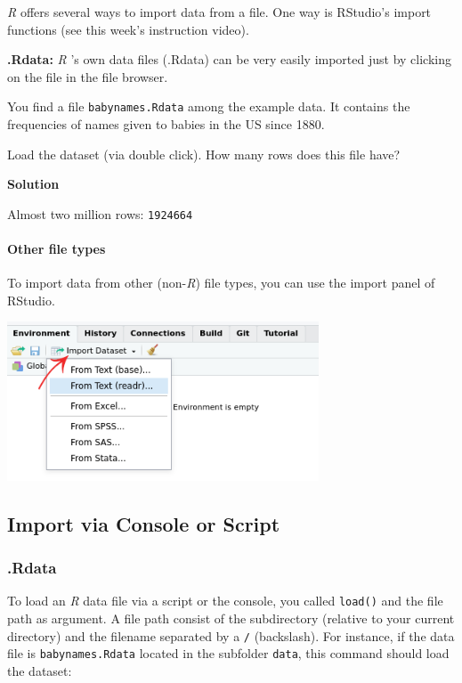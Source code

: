 \documentclass[
]{scrartcl}
\makeatletter
\newenvironment{kframe}{%
\medskip{}
\setlength{\fboxsep}{.8em}
 \def\at@end@of@kframe{}%
 \ifinner\ifhmode%
  \def\at@end@of@kframe{\end{minipage}}%
  \begin{minipage}{\columnwidth}%
 \fi\fi%
 \def\FrameCommand##1{\hskip\@totalleftmargin \hskip-\fboxsep
 \colorbox{shadecolor}{##1}\hskip-\fboxsep
     \hskip-\linewidth \hskip-\@totalleftmargin \hskip\columnwidth}%
 \MakeFramed {\advance\hsize-\width
   \@totalleftmargin\z@ \linewidth\hsize
   \@setminipage}}%
 {\par\unskip\endMakeFramed%
 \at@end@of@kframe}
\newenvironment{rmdblock}[1]
  {
  \begin{itemize}
  \renewcommand{\labelitemi}{
    \raisebox{-.7\height}[0pt][0pt]{
      {\setkeys{Gin}{width=3em,keepaspectratio}\texttt{[image: images/\#1]}}
    }
  }
  \setlength{\fboxsep}{1em}
  \begin{kframe}
  \item
  }
  {
  \end{kframe}
  \end{itemize}
  }
\newenvironment{myexercise}
    {\begin{rmdblock}{exercise_green}}
    {\end{rmdblock}}
\newenvironment{webexsolution}[1]
    {\par\tiny\textbf{#1}}
    {\par}
\newcommand{\webexhide}[1]{\begin{webexsolution}{#1}}
\newcommand{\webexunhide}{\end{webexsolution}}
\makeatother
\begin{document}
\emph{R} offers several ways to import data from a file. One way is RStudio's import functions (see this week's instruction video).

\textbf{.Rdata:} \emph{R} 's own data files (.Rdata) can be very easily imported just by clicking on the file in the file browser.

\begin{myexercise}
You find a file \texttt{babynames.Rdata} among the example data. It
contains the frequencies of names given to babies in the US since 1880.

Load the dataset (via double click). How many rows does this file have?
\end{myexercise}

\webexhide{Solution}

Almost two million rows: \texttt{1924664}
\webexunhide

\paragraph*{Other file types}\label{other-file-types}

To import data from other (non-\emph{R}) file types, you can use the import panel of RStudio.

\includegraphics[width=350px]{images/data_import}

\subsection{Import via Console or Script}\label{import-via-console-or-script}

\subsubsection*{.Rdata}\label{rdata}

To load an \emph{R} data file via a script or the console, you called \texttt{load()} and the file path as argument. A file path consist of the subdirectory (relative to your current directory) and the filename separated by a \texttt{/} (backslash). For instance, if the data file is \texttt{babynames.Rdata} located in the subfolder \texttt{data}, this command should load the dataset:
\end{document}
